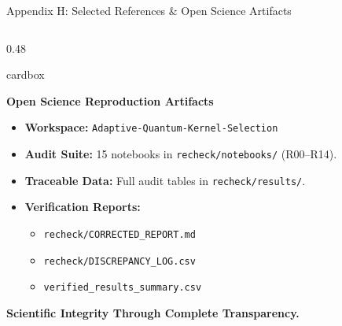 \documentclass[aspectratio=169, 10pt]{beamer}
\newcommand{\cardbox}[3]{%
  \begin{beamercolorbox}[wd=\linewidth,rounded=true,sep=2.5pt]{cardbox}%
    {\bfseries\scriptsize\color{#1}#2\par}\vspace*{1pt}%
    {\footnotesize #3}%
  \end{beamercolorbox}%
}
\begin{document}
\begin{frame}{Appendix H: Selected References \& Open Science Artifacts}
\begin{columns}[T]
    \begin{column}{0.48\textwidth}
      \cardbox{TealAccent}{Open Science Reproduction Artifacts}{
        \begin{itemize}\setlength\itemsep{1pt}\scriptsize
          \item \textbf{Workspace:} \texttt{Adaptive-Quantum-Kernel-Selection}
          \item \textbf{Audit Suite:} 15 notebooks in \texttt{recheck/notebooks/} (R00--R14).
          \item \textbf{Traceable Data:} Full audit tables in \texttt{recheck/results/}.
          \item \textbf{Verification Reports:}
          \begin{itemize}\setlength\itemsep{0.5pt}\tiny
            \item \texttt{recheck/CORRECTED\_REPORT.md}
            \item \texttt{recheck/DISCREPANCY\_LOG.csv}
            \item \texttt{verified\_results\_summary.csv}
          \end{itemize}
        \end{itemize}
      }
      \vspace*{3pt}
      \begin{center}
        {\scriptsize\bfseries\color{MedPurple} Scientific Integrity Through Complete Transparency.}
      \end{center}
    \end{column}
  \end{columns}
\end{frame}
\end{document}
